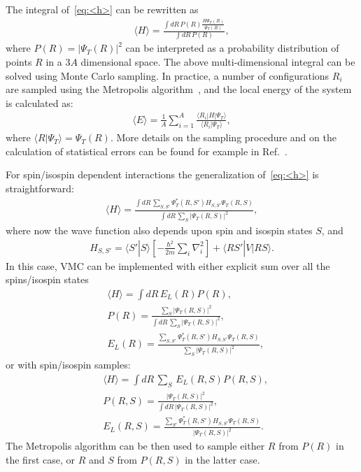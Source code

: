 \documentclass[aps,prc,twocolumn,superscriptaddress,showpacs,floatfix,nofootinbib]{revtex4-1}
\newcommand{\red}[1]{\protect\textcolor{red}{#1}}
\begin{document}
The integral of~\cref{eq:<h>} can be rewritten as
\begin{align}
\langle H\rangle=\frac{\displaystyle\int dR\,P(R) \frac{H\Psi_T(R)}{\Psi_T(R)}}{\displaystyle\int dR\,P(R)} ,
\end{align}
where $P(R)=|\Psi_T(R)|^2$ can be interpreted as a probability distribution of points $R$ in a $3A$ 
dimensional space.
The above multi-dimensional integral can be solved using Monte Carlo sampling.
In practice, a number of configurations $R_i$ are sampled using the Metropolis algorithm~\cite{Metropolis:1953}, 
and the local energy of the system is calculated as:
\begin{align}
\langle E\rangle=\frac{1}{A}\sum_{i=1}^A \frac{\langle R_i|H|\Psi_T\rangle}{\langle R_i|\Psi_T\rangle} ,
\end{align}
where $\langle R|\Psi_T\rangle=\Psi_T(R)$.
More details on the sampling procedure and on the calculation of statistical errors can be found 
for example in Ref.~\red{\cite{??}}.

For spin/isospin dependent interactions the generalization of~\cref{eq:<h>} is straightforward:
\begin{align}
\langle H\rangle=\frac{\displaystyle\int dR\,\sum_{S,S'}\Psi_T^*(R,S')H_{S,S'}\Psi_T(R,S)}
{\displaystyle\int dR\,\sum_S|\Psi_T(R,S)|^2} ,
\end{align}
where now the wave function also depends upon spin and isospin states $S$, and
\begin{align}
H_{S,S'}=\langle S'|S\rangle\left[-\frac{\hbar^2}{2m}\sum_i\nabla_i^2\right]+\langle RS'|V|RS\rangle .
\end{align}
In this case, VMC can be implemented with either explicit sum over all the spins/isospin states
\begin{align}
&\langle H\rangle=\displaystyle\int dR\,E_L(R)P(R) ,\nonumber \\
&P(R)=\frac{\sum_S|\Psi_T(R,S)|^2}{\displaystyle\int dR\,\sum_S|\Psi_T(R,S)|^2} ,\nonumber \\
&E_L(R)=\frac{\sum_{S,S'}\Psi_T^*(R,S')H_{S,S'}\Psi_T(R,S)}{\sum_S|\Psi_T(R,S)|^2} ,
\end{align}
or with spin/isospin samples:
\begin{align}
&\langle H\rangle=\displaystyle\int dR\,\sum_S\,E_L(R,S)P(R,S) ,\nonumber \\
&P(R,S)=\frac{|\Psi_T(R,S)|^2}{\displaystyle\int dR\,|\Psi_T(R,S)|^2} ,\nonumber \\
&E_L(R,S)=\frac{\sum_{S'}\Psi_T^*(R,S')H_{S,S'}\Psi_T(R,S)}{|\Psi_T(R,S)|^2} .
\end{align}
The Metropolis algorithm can be then used to sample either $R$ from $P(R)$ in the first case, 
or $R$ and $S$ from $P(R,S)$ in the latter case.
\end{document}
